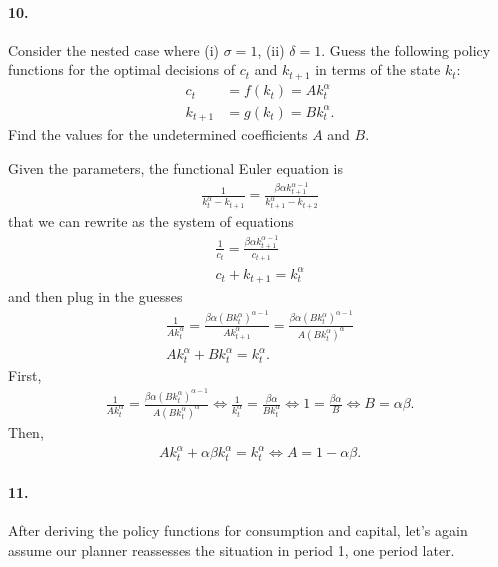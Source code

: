 \documentclass[dvipsnames,11pt]{article}
\begin{document}
\paragraph{10.} Consider the nested case where (i) $\sigma = 1$, (ii) $\delta = 1$. Guess the following policy functions for the optimal decisions of $c_t$ and $k_{t+1}$ in terms of the state $k_t$:
                \begin{align*}
                    c_t & = f(k_t) = A k_t^\alpha\\
                    k_{t+1} & = g(k_t) = B k_t^\alpha.
                \end{align*}
            Find the values for the undetermined coefficients $A$ and $B$.  

\begin{solution} Given the parameters, the functional Euler equation is 
\begin{gather*}
    \frac{1}{k_t^\alpha-k_{t+1}}=\frac{\beta\alpha k_{t+1}^{\alpha-1}}{k_{t+1}^\alpha-k_{t+2}}
\end{gather*}
that we can rewrite as the system of equations
\begin{gather}
    \frac{1}{c_t}=\frac{\beta\alpha k_{t+1}^{\alpha-1}}{c_{t+1}} \\ c_t+k_{t+1}=k_t^\alpha
\end{gather}
and then plug in the guesses 
\begin{gather}
    \frac{1}{Ak_t^\alpha}=\frac{\beta\alpha (Bk_t^\alpha)^{\alpha-1}}{Ak_{t+1}^\alpha}=\frac{\beta\alpha (Bk_t^\alpha)^{\alpha-1}}{A(Bk_t^\alpha)^\alpha} \\ Ak_t^\alpha+Bk_t^\alpha=k_t^\alpha.
\end{gather}
First, 
\begin{gather*}
     \frac{1}{Ak_t^\alpha}=\frac{\beta\alpha (Bk_t^\alpha)^{\alpha-1}}{A(Bk_t^\alpha)^\alpha}\iff \frac{1}{k_t^\alpha} = \frac{\beta\alpha}{Bk_t^\alpha} \iff 1 = \frac{\beta\alpha}{B} \iff B = \alpha\beta.
\end{gather*}
Then, 
\begin{gather*}
    Ak_t^\alpha+\alpha\beta k_t^\alpha=k_t^\alpha \iff A = 1-\alpha \beta.
\end{gather*}

                    
                \end{solution}

\paragraph{11.} After deriving the policy functions for consumption and capital, let's again assume our planner reassesses the situation in period 1, one period later. 
\end{document}
